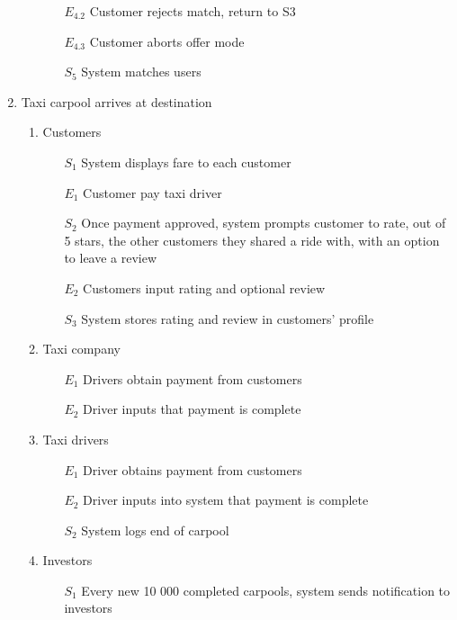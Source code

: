 \documentclass[]{article}
\begin{document}
\begin{enumerate}[{\textbf{BE}}1.]
\begin{enumerate}[{VP4}.1]
\begin{enumerate}
                \item[$E_{4.2}$] Customer rejects match, return to S3
                \item[$E_{4.3}$] Customer aborts offer mode
                \item[$S_5$] System matches users
            \end{enumerate}
    \end{enumerate}
    \item Taxi carpool arrives at destination
    \begin{enumerate}[{VP5}.1]
        \item Customers
            \begin{enumerate}
                \item[$S_1$] System displays fare to each customer
                \item[$E_1$] Customer pay taxi driver
                \item[$S_2$] Once payment approved, system prompts customer to rate, out of 5 stars,  the other customers they shared a ride with, with an option to leave a review
                \item[$E_2$] Customers input rating and optional review
                \item[$S_3$] System stores rating and review in customers’ profile
            \end{enumerate}
        \item Taxi company
            \begin{enumerate}
                \item[$E_1$] Drivers obtain payment from customers
                \item[$E_2$] Driver inputs that payment is complete
            \end{enumerate}
        \item Taxi drivers
            \begin{enumerate}
                \item[$E_1$] Driver obtains payment from customers
                \item[$E_2$] Driver inputs into system that payment is complete
                \item[$S_2$] System logs end of carpool
            \end{enumerate}
        \item Investors
            \begin{enumerate}
                \item[$S_1$] Every new 10 000 completed carpools, system sends notification to investors

\end{enumerate}
\end{enumerate}
\end{enumerate}
\end{document}
